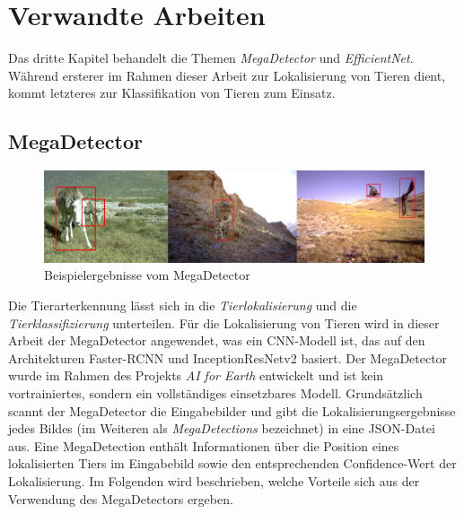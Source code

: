 \chapter{Verwandte Arbeiten} \label{chap:relatedwork}

Das dritte Kapitel behandelt die Themen \emph{MegaDetector} und \emph{EfficientNet}. Während ersterer im Rahmen dieser Arbeit zur Lokalisierung von Tieren dient, kommt letzteres zur Klassifikation von Tieren zum Einsatz. 

\section{MegaDetector} \label{sec:megadetector}

\begin{figure}[!hb]
	\centering
	\includegraphics[width=\linewidth]{images/Megadetector example}
	\caption{Beispielergebnisse vom MegaDetector \protect\cite{beery2019efficient}}
	\label{fig:Megadetectorexample}
\end{figure}

Die Tierarterkennung lässt sich in die \emph{Tierlokalisierung} und die \emph{Tierklassifizierung} unterteilen. Für die Lokalisierung von Tieren wird in dieser Arbeit der MegaDetector \cite{beery2019efficient} angewendet, was ein CNN-Modell ist, das auf den Architekturen Faster-RCNN \cite{ren2016faster} und InceptionResNetv2 \cite{szegedy2016inceptionv4} basiert. Der MegaDetector wurde im Rahmen des Projekts \emph{AI for Earth} entwickelt und ist kein vortrainiertes, sondern ein vollständiges einsetzbares Modell. Grundsätzlich scannt der MegaDetector die Eingabebilder und gibt die Lokalisierungsergebnisse jedes Bildes (im Weiteren als \emph{MegaDetections} bezeichnet) in eine JSON-Datei aus. Eine MegaDetection enthält Informationen über die Position eines lokalisierten Tiers im Eingabebild sowie den entsprechenden Confidence-Wert der Lokalisierung. Im Folgenden wird beschrieben, welche Vorteile sich aus der Verwendung des MegaDetectors ergeben.

